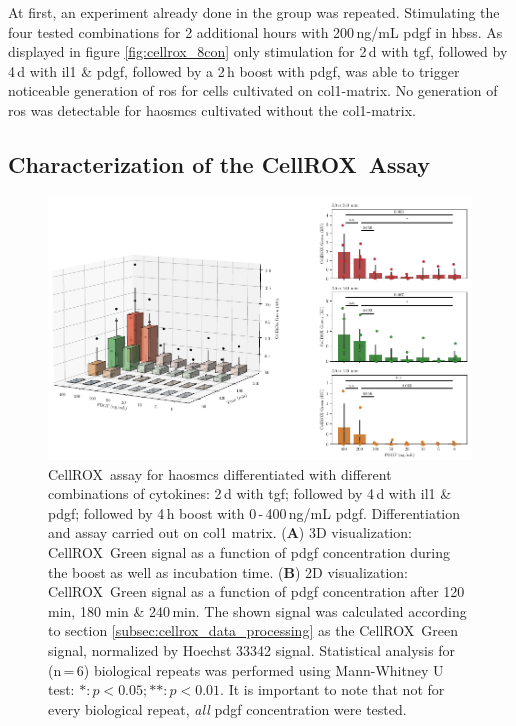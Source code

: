     At first, an experiment already done in the group was repeated. Stimulating the four tested combinations for 2 additional hours with 200\,ng/mL \ac{pdgf} in \ac{hbss}. As displayed in figure \ref{fig:cellrox_8con} only stimulation for 2\,d with \ac{tgf}, followed by 4\,d with \ac{il1} \& \ac{pdgf}, followed by a 2\,h boost with \ac{pdgf}, was able to trigger noticeable generation of \ac{ros} for cells cultivated on \ac{col1}-matrix. No generation of \ac{ros} was detectable for \acp{haosmc} cultivated without the \ac{col1}-matrix.

    \subsection{Characterization of the CellROX\texttrademark~Assay}
    \begin{figure}[h!]
    \capstart
        \centering
    	\includegraphics{Abbildung/CellROX_titration_no_norm.pdf}

    	\begin{minipage}{\captionwidth}
    		\caption[cellROX_titration]{ \newline
            CellROX\texttrademark~assay for \acp{haosmc} differentiated with different combinations of cytokines: 2\,d with \ac{tgf}; followed by 4\,d with \ac{il1} \& \ac{pdgf}; followed by 4\,h boost with 0\,-\,400\,ng/mL \ac{pdgf}. Differentiation and assay carried out on \ac{col1} matrix.
            (\textbf{A}) 3D visualization: CellROX\texttrademark~Green signal as a function of \ac{pdgf} concentration during the boost as well as incubation time.
            (\textbf{B}) 2D visualization: CellROX\texttrademark~Green signal as a function of \ac{pdgf} concentration after 120 min, 180 min \& 240\,min.
            The shown signal was calculated according to section \ref{subsec:cellrox_data_processing} as the CellROX\texttrademark~Green signal, normalized by Hoechst 33342 signal. Statistical analysis for (n\,=\,6) biological repeats was performed using Mann-Whitney U test: $*: p < 0.05; **: p < 0.01$. It is important to note that not for every biological repeat, \textit{all} \ac{pdgf} concentration were tested. }
    		\label{fig:cellROX_titration}
    	\end{minipage}
    \end{figure}

